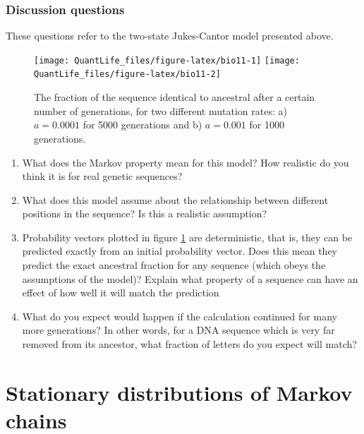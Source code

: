 \documentclass[
]{book}
\theoremstyle{definition}
\theoremstyle{definition}
\theoremstyle{definition}
\theoremstyle{remark}
\begin{document}
\hypertarget{discussion-questions-5}{%
\subsection{Discussion questions}\label{discussion-questions-5}}

These questions refer to the two-state Jukes-Cantor model presented above.

\begin{figure}

{\centering \texttt{[image: QuantLife\_files/figure-latex/bio11-1]} \texttt{[image: QuantLife\_files/figure-latex/bio11-2]} 

}

\caption{The fraction of the sequence identical to ancestral after a certain number of generations, for two different mutation rates: a) $a=0.0001$ for 5000 generations and b) $a=0.001$ for 1000 generations.}\label{fig:bio11}
\end{figure}

\begin{enumerate}
\def\labelenumi{\arabic{enumi}.}
\item
  What does the Markov property mean for this model? How realistic do you think it is for real genetic sequences?
\item
  What does this model assume about the relationship between different positions in the sequence? Is this a realistic assumption?
\item
  Probability vectors plotted in figure \ref{fig:bio11} are deterministic, that is, they can be predicted exactly from an initial probability vector. Does this mean they predict the exact ancestral fraction for any sequence (which obeys the assumptions of the model)? Explain what property of a sequence can have an effect of how well it will match the prediction
\item
  What do you expect would happen if the calculation continued for many more generations? In other words, for a DNA sequence which is very far removed from its ancestor, what fraction of letters do you expect will match?
\end{enumerate}

\hypertarget{stationary-distributions-of-markov-chains}{%
\chapter{Stationary distributions of Markov chains}\label{stationary-distributions-of-markov-chains}}
\end{document}
